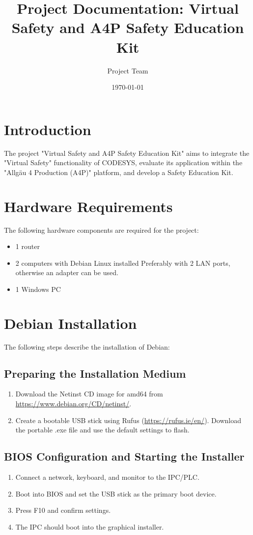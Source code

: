 \documentclass[a4paper,12pt]{article}
\title{\sffamily\bfseries Project Documentation: Virtual Safety and A4P Safety Education Kit}
\author{\sffamily Project Team}
\date{\sffamily \today}
\begin{document}
\maketitle
\clearpage

\tableofcontents
\clearpage

\section{Introduction}
The project "Virtual Safety and A4P Safety Education Kit" aims to integrate the "Virtual Safety" functionality of CODESYS, evaluate its application within the "Allgäu 4 Production (A4P)" platform, and develop a Safety Education Kit.

\section{Hardware Requirements}
The following hardware components are required for the project:
\begin{itemize}
\item 1 router
\item 2 computers with Debian Linux installed  
Preferably with 2 LAN ports, otherwise an adapter can be used.
\item 1 Windows PC
\end{itemize}

\section{Debian Installation}
The following steps describe the installation of Debian:

\subsection{Preparing the Installation Medium}
\begin{enumerate}
\item Download the Netinst CD image for amd64 from \url{https://www.debian.org/CD/netinst/}.
\item Create a bootable USB stick using Rufus (\url{https://rufus.ie/en/}). Download the portable .exe file and use the default settings to flash.
\end{enumerate}

\subsection{BIOS Configuration and Starting the Installer}
\begin{enumerate}
\item Connect a network, keyboard, and monitor to the IPC/PLC.
\item Boot into BIOS and set the USB stick as the primary boot device.
\item Press F10 and confirm settings.
\item The IPC should boot into the graphical installer.
\end{enumerate}
\end{document}

